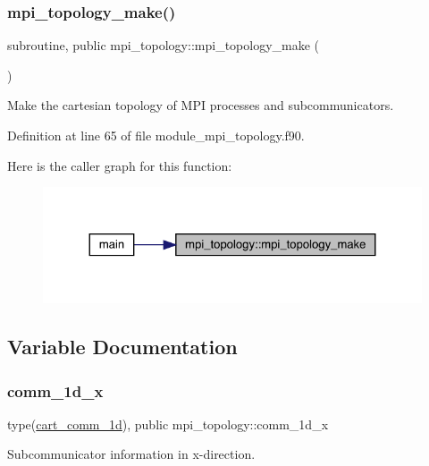 \subsubsection{\texorpdfstring{mpi\_topology\_make()}{mpi\_topology\_make()}}
{\footnotesize\ttfamily subroutine, public mpi\+\_\+topology\+::mpi\+\_\+topology\+\_\+make (\begin{DoxyParamCaption}{ }\end{DoxyParamCaption})}



Make the cartesian topology of M\+PI processes and subcommunicators. 



Definition at line 65 of file module\+\_\+mpi\+\_\+topology.\+f90.

Here is the caller graph for this function\+:
\nopagebreak
\begin{figure}[H]
\begin{center}
\leavevmode
\includegraphics[width=324pt]{namespacempi__topology_a8819f16f50aded913f17520a29d3ec4c_icgraph}
\end{center}
\end{figure}


\subsection{Variable Documentation}
\mbox{\label{namespacempi__topology_a4ef8d80f442649d77707d5ebeeefa391}} 
\subsubsection{\texorpdfstring{comm\_1d\_x}{comm\_1d\_x}}
{\footnotesize\ttfamily type(\mbox{\hyperlink{structmpi__topology_1_1cart__comm__1d}{cart\+\_\+comm\+\_\+1d}}), public mpi\+\_\+topology\+::comm\+\_\+1d\+\_\+x}



Subcommunicator information in x-\/direction. 



